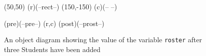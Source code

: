 \documentclass{article}
\begin{document}
\begin {figure}


\Draw


\MinNodeSize(50,50)
\RectNode(r)(--rect--)
\Move (150,-150)
\CircleNode(c)(-- --)

\Node(pre)(--pre--)
\Edge(r,c)
\Node(post)(--prost--)

    
\EndDraw

\caption {An object diagram showing the value of the
variable \texttt {roster} after three Students have been
added}

\label {fig:ArrayList3}

\end {figure}
\end{document}

